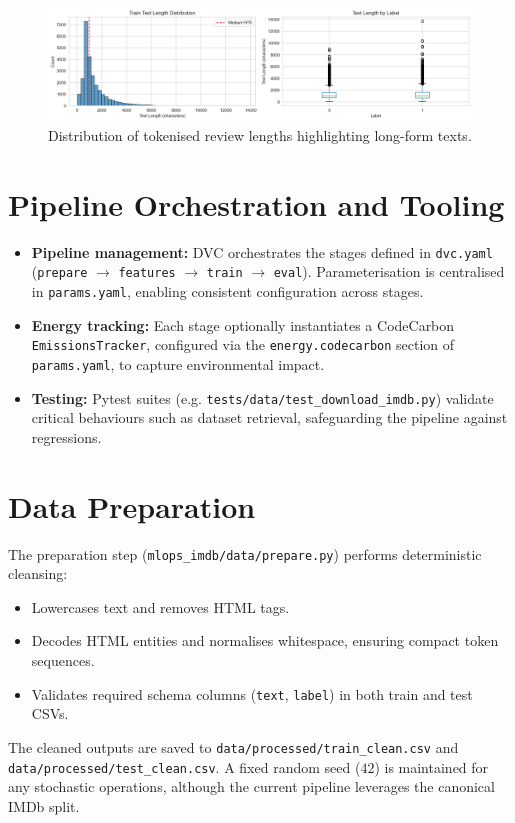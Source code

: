 \documentclass[11pt,a4paper]{article}
\begin{document}
\begin{figure}[h]
  \centering
  \includegraphics[width=1\textwidth]{text_length_distribution.png}
  \caption{Distribution of tokenised review lengths highlighting long-form texts.}
  \label{fig:text_len}
\end{figure}

\section{Pipeline Orchestration and Tooling}
\begin{itemize}[leftmargin=*]
  \item \textbf{Pipeline management:} DVC orchestrates the stages defined in \texttt{dvc.yaml} (\texttt{prepare} \(\rightarrow\) \texttt{features} \(\rightarrow\) \texttt{train} \(\rightarrow\) \texttt{eval}). Parameterisation is centralised in \texttt{params.yaml}, enabling consistent configuration across stages.
  \item \textbf{Energy tracking:} Each stage optionally instantiates a CodeCarbon \texttt{EmissionsTracker}, configured via the \texttt{energy.codecarbon} section of \texttt{params.yaml}, to capture environmental impact.
  \item \textbf{Testing:} Pytest suites (e.g. \texttt{tests/data/test\_download\_imdb.py}) validate critical behaviours such as dataset retrieval, safeguarding the pipeline against regressions.
\end{itemize}

\section{Data Preparation}
The preparation step (\texttt{mlops\_imdb/data/prepare.py}) performs deterministic cleansing:
\begin{itemize}[leftmargin=*]
  \item Lowercases text and removes HTML tags.
  \item Decodes HTML entities and normalises whitespace, ensuring compact token sequences.
  \item Validates required schema columns (\texttt{text}, \texttt{label}) in both train and test CSVs.
\end{itemize}
The cleaned outputs are saved to \texttt{data/processed/train\_clean.csv} and \texttt{data/processed/test\_clean.csv}. A fixed random seed (\(42\)) is maintained for any stochastic operations, although the current pipeline leverages the canonical IMDb split.
\end{document}
